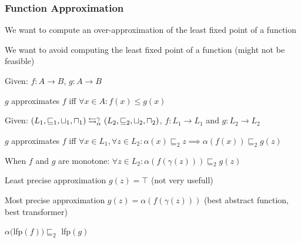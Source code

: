 \subsubsection{Function Approximation}
\enumstart
	\item We want to compute an over-approximation of the least fixed point of a function
	\item We want to avoid computing the least fixed point of a function (might not be feasible)
	\item Given: $f: A \rightarrow B$, $g: A \rightarrow B$
	\enumstart
		\item $g$ approximates $f$ iff $\forall x \in A: f(x) \le g(x)$
	\enumend
	\item Given: $(L_1, \sqsubseteq_1, \sqcup_1, \sqcap_1) \leftrightarrows^{\gamma_{}}_{\alpha_{}} (L_2, \sqsubseteq_2, \sqcup_2, \sqcap_2)$, $f: L_1 \rightarrow L_1$ and $g: L_2 \rightarrow L_2$
	\enumstart
		\item $g$ approximates $f$ iff $\forall x \in L_1, \forall z \in L_2: \alpha(x) \sqsubseteq_2 z \implies \alpha(f(x)) \sqsubseteq_2 g(z)$
		\item When $f$ and $g$ are monotone: $\forall z \in L_2: \alpha(f(\gamma(z))) \sqsubseteq_2 g(z)$
	\enumend
	\item Least precise approximation $g(z) = \top$ (not very usefull)
	\item Most precise approximation $g(z) = \alpha(f(\gamma(z)))$ (best abstract function,  best transformer)
	\item $\alpha($lfp$(f)) \sqsubseteq_2 $ lfp$(g)$
\enumend
